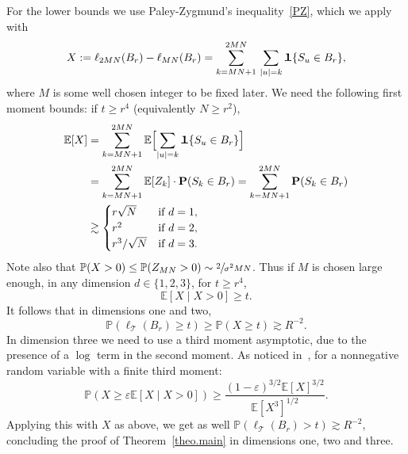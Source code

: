 \documentclass[JEP,XML,SOM,Unicode,NoFloatCountersInSection,published]{cedram}
\theoremstyle{plain}
\theoremstyle{definition}
\newcommand\T{\mathcal{T}}
\newcommand{\1}{{\text{\Large $\mathfrak 1$}}}
\begin{document}
For the lower bounds we use Paley-Zygmund's inequality~\eqref{PZ},
which we apply with
\[
X:= \ell_{2MN}(B_r) - \ell_{MN}(B_r) = \sum_{k=MN+1}^{2MN}\,
\sum_{|u|=k} \1\{S_u\in B_r\},
\]
where $M$ is some well chosen integer to be fixed later.
We need the following first moment bounds: if $t\ge r^4$ (equivalently $N\ge r^2$),
\begin{align*}
\mathbb E[X] & = \sum_{k=MN+1}^{2MN} \mathbb E\Bigl[
\sum_{|u|=k} \1\{S_u \in B_r\}\Bigr]\\
&= \sum_{k=MN+1}^{2MN} \mathbb E[Z_k] \cdot \mathbf P(S_k \in B_r) = \sum_{k=MN+1}^{2MN}\mathbf P(S_k \in B_r) \\
& \gtrsim
\begin{cases}
r\sqrt N & \text{if }d=1, \\
r^2 & \text{if }d=2, \\
r^3/\sqrt{N} & \text{if }d=3.
\end{cases}
\end{align*}
Note also that $\mathbb P(X>0) \le \mathbb P(Z_{MN}>0) \sim \sfrac2 {\sigma^2MN}$. Thus if $M$ is chosen large enough, in any dimension $d\in \{1,2,3\}$, for $t\ge r^4$,
\begin{equation*}
\mathbb E[X\mid X>0] \geq t.
\end{equation*}
It follows that in dimensions one and two,
\[
\mathbb P(\ell_\T(B_r)\ge t ) \ge \mathbb P(X\ge t ) \gtrsim R^{-2}.
\]
In dimension three we need to use a third moment asymptotic, due to the presence of a $\log $ term in the second moment.
As noticed in~\cite[Lem.\,4.4]{AHJ}, for a nonnegative random variable with a finite third moment:
\[
\mathbb P(X\ge \varepsilon \mathbb E[X\mid X>0] )\ge \frac{(1-\varepsilon)^{3/2}\mathbb E[X]^{3/2}}{\mathbb E[X^3]^{1/2}}.
\]
Applying this with $X$ as above,
we get as well $\mathbb P(\ell_\T(B_r)>t ) \gtrsim R^{-2}$, concluding the proof of Theorem~\ref{theo.main} in dimensions one, two and three.
\end{document}
